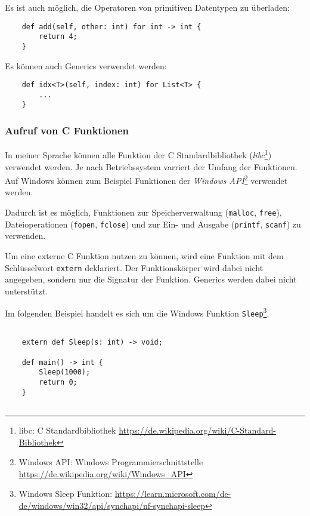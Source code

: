         Es ist auch möglich, die Operatoren von primitiven Datentypen zu überladen:

        \begin{lstlisting}
    def add(self, other: int) for int -> int {
        return 4;
    }
        \end{lstlisting}

        Es können auch Generics verwendet werden:

        \begin{lstlisting}
    def idx<T>(self, index: int) for List<T> {
        ...
    }
        \end{lstlisting}
        
        \subsubsection{Aufruf von C Funktionen}

        In meiner Sprache können alle Funktion der C Standardbibliothek 
        (\emph{libc}\footnote{libc: C Standardbibliothek \url{https://de.wikipedia.org/wiki/C-Standard-Bibliothek}})
        verwendet werden. Je nach Betriebssystem varriert der Umfang der Funktionen. Auf Windows können zum Beispiel Funktionen
        der \emph{Windows API}\footnote{Windows API: Windows Programmierschnittstelle \url{https://de.wikipedia.org/wiki/Windows_API}}
        verwendet werden.

        
        Dadurch ist es möglich, Funktionen zur Speicherverwaltung (\texttt{malloc}, \texttt{free}), Dateioperationen (\texttt{fopen}, \texttt{fclose}) und zur 
        Ein- und Ausgabe (\texttt{printf}, \texttt{scanf}) zu verwenden.
        
        Um eine externe C Funktion nutzen zu können, wird eine Funktion mit dem Schlüsselwort \texttt{extern} deklariert.
        Der Funktionskörper wird dabei nicht angegeben, sondern nur die Signatur der Funktion. Generics werden dabei nicht unterstützt.
        
        Im folgenden Beispiel handelt es sich um die Windows Funktion \texttt{Sleep}\footnote{Windows Sleep Funktion: \url{https://learn.microsoft.com/de-de/windows/win32/api/synchapi/nf-synchapi-sleep}}.
        
        \begin{lstlisting}
            
    extern def Sleep(s: int) -> void;
    
    def main() -> int {
        Sleep(1000);
        return 0;
    }
                
        \end{lstlisting}
            
